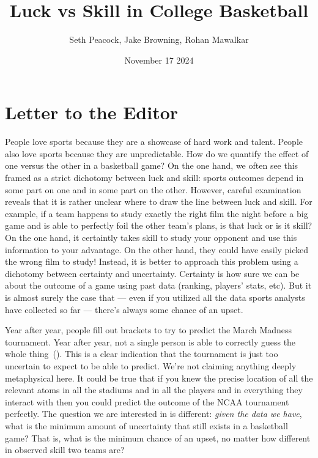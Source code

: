 \documentclass{article}
\title{Luck vs Skill in College Basketball}
\author{Seth Peacock, Jake Browning, Rohan Mawalkar}
\date{November 17 2024}
\begin{document}
\maketitle

\newpage

\section{Letter to the Editor}

People love sports because they are a showcase of hard work and talent. People also love sports because they are unpredictable. How do we quantify the effect of one versus the other in a basketball game? On the one hand, we often see this framed as a strict dichotomy between luck and skill: sports outcomes depend in some part on one and in some part on the other. However, careful examination reveals that it is rather unclear where to draw the line between luck and skill. For example, if a team happens to study exactly the right film the night before a big game and is able to perfectly foil the other team's plans, is that luck or is it skill? On the one hand, it certaintly takes skill to study your opponent and use this information to your advantage. On the other hand, they could have easily picked the wrong film to study! Instead, it is better to approach this problem using a dichotomy between certainty and uncertainty. Certainty is how sure we can be about the outcome of a game using past data (ranking, players' stats, etc). But it is almost surely the case that --- even if you utilized all the data sports analysts have collected so far --- there's always some chance of an upset.

Year after year, people fill out brackets to try to predict the March Madness tournament. Year after year, not a single person is able to correctly guess the whole thing~(\cite{cbsnewsAnyoneEver}). This is a clear indication that the tournament is just too uncertain to expect to be able to predict. We're not claiming anything deeply metaphysical here. It could be true that if you knew the precise location of all the relevant atoms in all the stadiums and in all the players and in everything they interact with then you could predict the outcome of the NCAA tournament perfectly. The question we are interested in is different: \textit{given the data we have}, what is the minimum amount of uncertainty that still exists in a basketball game? That is, what is the minimum chance of an upset, no matter how different in observed skill two teams are?
\end{document}
